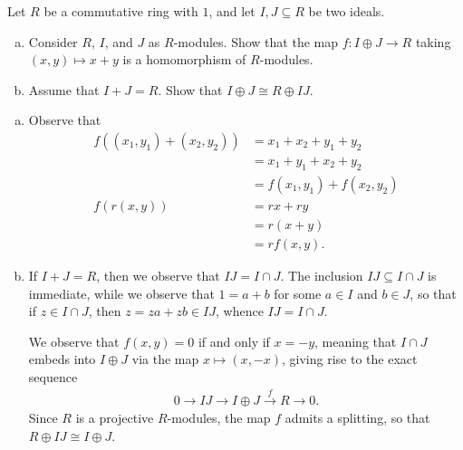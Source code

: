 \documentclass[10pt]{mypackage}
\begin{document}
\begin{problem}[Problem 3]
  Let $R$ be a commutative ring with $1$, and let $I,J\subseteq R$ be two ideals.
  \begin{enumerate}[(a)]
    \item Consider $R$, $I$, and $J$ as $R$-modules. Show that the map $f\colon I\oplus J\rightarrow R$ taking $\left( x,y \right)\mapsto x + y$ is a homomorphism of $R$-modules.
    \item Assume that $I + J = R$. Show that $I\oplus J\cong R\oplus IJ$.
  \end{enumerate}
\end{problem}
\begin{solution}\hfill
  \begin{enumerate}[(a)]
    \item Observe that
      \begin{align*}
        f\left( \left( x_1,y_1 \right) + \left( x_2,y_2 \right) \right) &= x_1 + x_2 + y_1 + y_2\\
                                                                        &= x_1 + y_1 + x_2 + y_2\\
                                                                        &= f\left( x_1,y_1 \right) + f\left( x_2,y_2 \right)\\
        f\left( r\left( x,y \right) \right) &= rx + ry\\
                                            &= r\left( x + y \right)\\
                                            &= rf\left( x,y \right).
      \end{align*}
    \item If $I + J = R$, then we observe that $IJ = I\cap J$. The inclusion $IJ\subseteq I\cap J$ is immediate, while we observe that $1 = a + b$ for some $a\in I$ and $b\in J$, so that if $z\in I\cap J$, then $z = za + zb\in IJ$, whence $IJ = I\cap J$.

      We observe that $f\left( x,y \right) = 0$ if and only if $x = -y$, meaning that $I\cap J$ embeds into $I\oplus J$ via the map $x\mapsto \left( x,-x \right)$, giving rise to the exact sequence
      \begin{align*}
        0 \rightarrow IJ \rightarrow I\oplus J \xrightarrow{f}R \rightarrow 0.
      \end{align*}
      Since $R$ is a projective $R$-modules, the map $f$ admits a splitting, so that $R\oplus IJ\cong I\oplus J$.
  \end{enumerate}
\end{solution}
\end{document}

